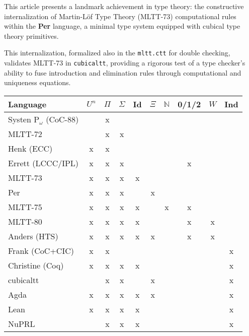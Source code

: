 \documentclass{article}
\begin{document}
This article presents a landmark achievement in type theory:
the constructive internalization of Martin-Löf Type Theory (MLTT-73) computational rules
within the \textbf{Per} language, a minimal type system equipped with
cubical type theory primitives.

This internalization, formalized also in the \texttt{mltt.ctt} for double checking,
validates MLTT-73 in \texttt{cubicaltt}, providing a rigorous test
of a type checker's ability to fuse introduction and elimination
rules through computational and uniqueness equations.

\begin{table}[!ht]
  \begin{tabular}{lccccccccc}
    \hline
       Language    & $U^n$ & $\Pi$ & $\Sigma$ & Id & $\Xi$ & $\mathbb{N}$ & 0/1/2 & $W$ & Ind  \\
    \hline
Systen P$_\omega$ (CoC-88)  &   & x &   &   &   &   &   &   &   \\
       MLTT-72              &   & x & x &   &   &   &   &   &   \\
       Henk (ECC)           & x & x &   &   &   &   &   &   &   \\
       Errett (LCCC/IPL)    & x & x & x &   &   &   & x &   &   \\
       MLTT-73              & x & x & x & x &   &   &   &   &   \\
       Per                  & x & x & x &   & x &   &   &   &   \\
       MLTT-75              & x & x & x & x &   & x & x &   &   \\
       MLTT-80              & x & x & x & x &   & & x   & x &   \\
       Anders (HTS)         & x & x & x & x & x &   & x & x &   \\
       Frank (CoC+CIC)      & x & x &   &   &   &   &   &   & x \\
       Christine (Coq)      & x & x & x & x &   &   &   &   & x \\
    \hline
       cubicaltt            &   & x & x &   & x &   &   &   & x \\
       Agda                 & x & x & x & x & x &   &   &   & x \\
       Lean                 & x & x & x & x &   &   &   &   & x \\
       NuPRL                &   & x & x & x &   &   &   &   & x \\
    \hline
  \end{tabular}
\end{table}
\end{document}
